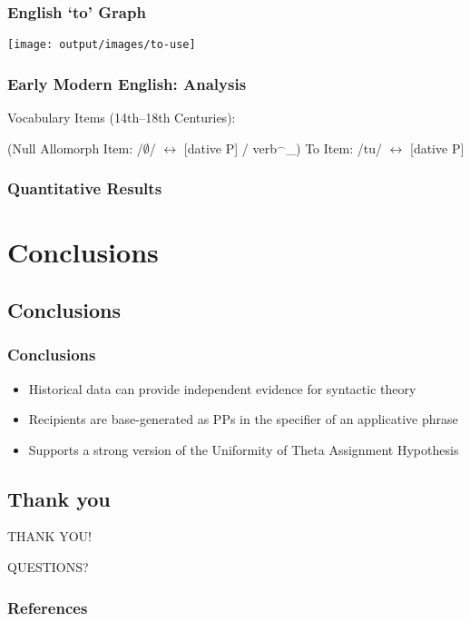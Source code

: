 \documentclass{beamer}
\begin{document}
\begin{frame}
	\frametitle{English `to' Graph}
	\texttt{[image: output/images/to-use]}
\end{frame}

\begin{frame}
	\frametitle{Early Modern English: Analysis}
	\begin{exe}
		\ex Vocabulary Items (14th--18th Centuries):
		\begin{xlist}
			\ex (Null Allomorph Item: /$\emptyset$/ $\leftrightarrow$ [dative P] / verb$^{\smallfrown}$\_)
			\ex To Item: /tu/ $\leftrightarrow$ [dative P]
		\end{xlist}
	\end{exe}
\end{frame}

\begin{frame}
	\frametitle{Quantitative Results}
	
\end{frame}

\section{Conclusions}
\subsection{Conclusions}
\begin{frame}
	\frametitle{Conclusions}
	\begin{itemize}
		\item Historical data can provide independent evidence for syntactic theory
		\item Recipients are base-generated as PPs in the specifier of an applicative phrase
		\item Supports a strong version of the Uniformity of Theta Assignment Hypothesis
	\end{itemize}
\end{frame}
\subsection{Thank you}
\begin{frame}
\vfill
\begin{center}
THANK YOU!
\end{center}
\vfill
\end{frame}

\begin{frame}
\vfill
\begin{center}
	QUESTIONS?
\end{center}
\vfill
\end{frame}


\begin{frame}[allowframebreaks]
\frametitle{References}
\nocite{Haddican.2011,Haddican.2012,Gerwin.2013}

{}
\end{frame}
\end{document}
